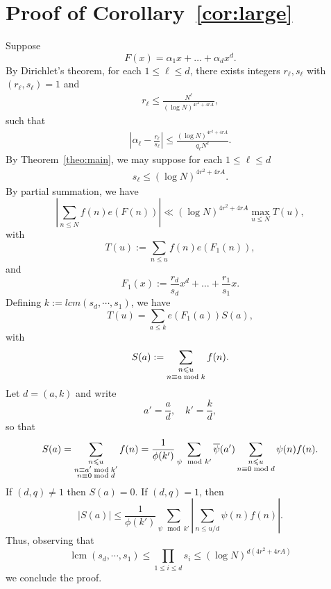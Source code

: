 \documentclass[12pt]{amsart}
\def\\{\cr}
\def\le{\leqslant}
\begin{document}
\section{Proof of Corollary~\ref{cor:large}}
Suppose 
$$F(x)=\alpha_1x+\dots+\alpha_d x^{d}.$$
By Dirichlet's theorem, for each $1\le \ell \le d$,  there exists integers $r_{\ell},s_{\ell}$ with $(r_{\ell},s_{\ell})=1$ and 
\begin{align*}
r_{\ell}\le \frac{N^{\ell}}{(\log{N})^{4r^2+4rA}},
\end{align*}
such that 
\begin{align*}
\left|\alpha_{\ell}-\frac{r_{\ell}}{s_{\ell}}\right|\le \frac{(\log{N})^{4r^2+4rA}}{q_{\ell}N^{\ell}}.
\end{align*}
By Theorem~\ref{theo:main}, we may suppose for each $1\le \ell \le d$
\begin{align*}
s_\ell\le (\log{N})^{4r^2+4rA}.
\end{align*}
By partial summation, we have
\begin{equation*}
\left| \sum_{n \le N} f(n) e(F(n))\right|\ll (\log{N})^{4r^2+4rA}\max_{u \le N} T(u) ,
\end{equation*}
with 
\begin{equation*}
T(u):=\sum_{n \le u} f(n) e(F_1(n)),
\end{equation*}
and
\begin{equation*}
F_1(x):=\frac{r_d}{s_d} x^d+\dots+\frac{r_1}{s_1} x.
\end{equation*} 
Defining $k:=lcm(s_d, \cdots,s_1)$, we have
\begin{equation*}
T(u)=\sum_{a \le k}e(F_1(a))S(a),
\end{equation*}
with
\begin{equation*}
S(a):=\sum_{\substack{n \le u\\ n \equiv a \bmod{k}}} f(n).
\end{equation*}
Let $d=(a,k)$ and write
\begin{equation*}
a'=\frac{a}{d}, \quad k'=\frac{k}{d},
\end{equation*}
so that 
\begin{equation*}
S(a)=\sum_{\substack{n \le u\\ n \equiv a' \bmod{k'} \\ n \equiv 0 \bmod{d}}} f(n)= \frac{1}{\phi(k')}\sum_{\psi \mod k'} \overline{\psi}(a')\sum_{\substack{n \le u\\ n\equiv 0 \bmod{d}}} \psi(n)f(n).
\end{equation*}
If $(d,q)\neq 1$ then $S(a)=0$. If $(d,q)=1$, then 
\begin{equation*}
|S(a)|\le \frac{1}{\phi(k')}\sum_{\psi \mod k'} \left|\sum_{n \le u/d} \psi(n)f(n)\right|.
\end{equation*}
Thus, observing that $$\operatorname{lcm}(s_d, \cdots,s_1)\le \prod_{1 \le i \le d} s_i\le (\log{N})^{d(4r^2+4rA)}$$ we conclude the proof.
\end{document}
